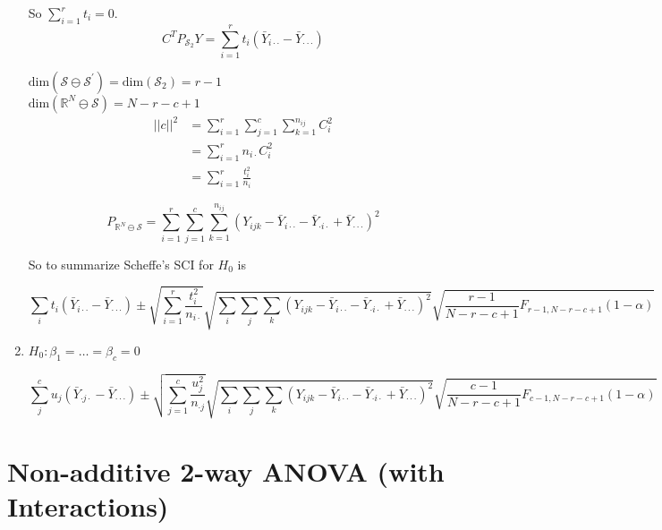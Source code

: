 \documentclass[11pt,fleqn]{book} %
\begin{document}
\begin{enumerate}[label = \Roman*]
So $\displaystyle \sum^r_{i=1} t_i = 0$.\\

		$$ C^T P_{\mathcal{S}_2}Y = \displaystyle \sum^r_{i=1} t_i (\bar{Y}_{i\cdot \cdot} - \bar{Y}_{\cdot \cdot \cdot})$$


$\text{dim}(\mathcal{S} \ominus \mathcal{S}^\prime) = \text{dim}(\mathcal{S}_2) = r - 1$\\
$\text{dim}(\mathbb{R}^N \ominus \mathcal{S}) = N -r - c + 1$\\

		\begin{align*}
			||c||^2 &= \displaystyle \sum^r_{i=1} \sum^c_{j=1} \sum^{n_{ij}}_{k=1}  C_i^2\\
				&= \displaystyle \sum^r_{i=1} n_{i \cdot} C_i^2\\
				&= \displaystyle \sum^r_{i=1} \frac{t_i^2}{n_i}
		\end{align*}


		$$ P_{\mathbb{R}^N \ominus \mathcal{S}} = \displaystyle \sum^r_{i=1} \sum^c_{j=1} \sum^{n_{ij}}_{k=1} (Y_{ijk} - \bar{Y}_{i\cdot \cdot} - \bar{Y}_{\cdot i \cdot} + \bar{Y}_{\cdot \cdot \cdot})^2$$

So to summarize Scheffe's SCI for $H_0$ is 


		$$\sum_i t_i (\bar{Y}_{i \cdot \cdot} - \bar{Y}_{\cdot \cdot \cdot}) \pm \sqrt{\sum^r_{i=1} \frac{t_i^2}{n_{i \cdot}}} \sqrt{\sum_i \sum_j \sum_k (Y_{ijk} - \bar{Y}_{i\cdot \cdot} - \bar{Y}_{\cdot i \cdot} + \bar{Y}_{\cdot \cdot \cdot})^2 } \sqrt{\frac{r - 1}{N - r -c +1} F_{r - 1, N - r -c +1} (1 - \alpha)} $$

	

	\item $H_0: \beta_1 = \dots = \beta_c = 0$


		$$\sum^c_j u_j (\bar{Y}_{ \cdot j \cdot} - \bar{Y}_{\cdot \cdot \cdot}) \pm \sqrt{\sum^c_{j=1} \frac{u_j^2}{n_{ \cdot j}}} \sqrt{\sum_i \sum_j \sum_k (Y_{ijk} - \bar{Y}_{i\cdot \cdot} - \bar{Y}_{\cdot i \cdot} + \bar{Y}_{\cdot \cdot \cdot})^2 } \sqrt{\frac{c - 1}{N - r -c +1} F_{c - 1, N - r -c +1} (1 - \alpha)} $$


	\end{enumerate}
 


\section{Non-additive 2-way ANOVA (with Interactions)}
\end{document}
